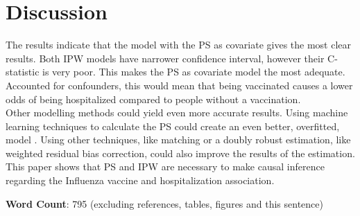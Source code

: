 \documentclass[
]{article}
\begin{document}
\hypertarget{discussion}{%
\section{Discussion}\label{discussion}}

The results indicate that the model with the PS as covariate gives the most clear results. Both IPW models have narrower confidence interval, however their C-statistic is very poor. This makes the PS as covariate model the most adequate. Accounted for confounders, this would mean that being vaccinated causes a lower odds of being hospitalized compared to people without a vaccination.\\
\hspace*{0.333em}\hspace*{0.333em}Other modelling methods could yield even more accurate results. Using machine learning techniques to calculate the PS could create an even better, overfitted, model \citep{schafer}. Using other techniques, like matching or a doubly robust estimation, like weighted residual bias correction, could also improve the results of the estimation.\\
\hspace*{0.333em}\hspace*{0.333em}This paper shows that PS and IPW are necessary to make causal inference regarding the Influenza vaccine and hospitalization association.

\textbf{Word Count}: 795 (excluding references, tables, figures and this sentence)

  
\end{document}
